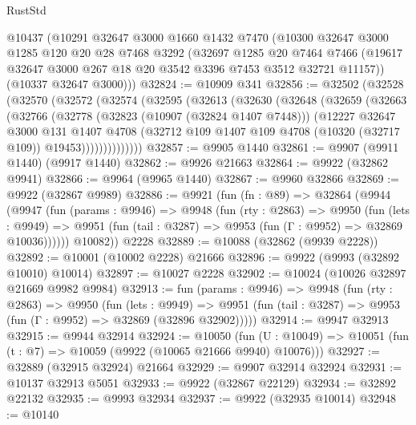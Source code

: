 \begin{lexlean}{RustStd}
\begin{coremodule}
    @10437
    (@10291
      @32647
      @3000
      @1660
      @1432
      @7470
      (@10300
        @32647
        @3000
        @1285
        @120
        @20
        @28
        @7468
        @3292
        (@32697
          @1285
          @20
          @7464
          @7466
          (@19617 @32647 @3000 @267 @18 @20 @3542 @3396 @7453 @3512 @32721 @11157))
        (@10337 @32647 @3000)))
@32824 := @10909 @341
@32856 := @32502
    (@32528
      (@32570
        (@32572
          (@32574
            (@32595
              (@32613
                (@32630
                  (@32648
                    (@32659
                      (@32663
                        (@32766
                          (@32778
                            (@32823 (@10907 (@32824 @1407 @7448)))
                            (@12227
                              @32647
                              @3000
                              @131
                              @1407
                              @4708
                              (@32712
                                @109
                                @1407
                                @109
                                @4708
                                (@10320 (@32717 @109))
                                @19453))))))))))))))
@32857 := @9905 @1440
@32861 := @9907 (@9911 @1440) (@9917 @1440)
@32862 := @9926 @21663
@32864 := @9922 (@32862 @9941)
@32866 := @9964 (@9965 @1440)
@32867 := @9960 @32866
@32869 := @9922 (@32867 @9989)
@32886 := @9921
    (fun (fn : @89) =>
    @32864
      (@9944
        (@9947
          (fun (params : @9946) =>
          @9948
            (fun (rty : @2863) =>
            @9950
              (fun (lets : @9949) =>
              @9951 (fun (tail : @3287) => @9953 (fun (Γ : @9952) => @32869 @10036))))))
        @10082))
    @2228
@32889 := @10088 (@32862 (@9939 @2228))
@32892 := @10001 (@10002 @2228) @21666
@32896 := @9922 (@9993 (@32892 @10010) @10014)
@32897 := @10027 @2228
@32902 := @10024 (@10026 @32897 @21669 @9982 @9984)
@32913 := fun (params : @9946) =>
  @9948
    (fun (rty : @2863) =>
    @9950
      (fun (lets : @9949) =>
      @9951 (fun (tail : @3287) => @9953 (fun (Γ : @9952) => @32869 (@32896 @32902)))))
@32914 := @9947 @32913
@32915 := @9944 @32914
@32924 := @10050
    (fun (U : @10049) => @10051 (fun (t : @7) => @10059 (@9922 (@10065 @21666 @9940) @10076)))
@32927 := @32889 (@32915 @32924) @21664
@32929 := @9907 @32914 @32924
@32931 := @10137 @32913 @5051
@32933 := @9922 (@32867 @22129)
@32934 := @32892 @22132
@32935 := @9993 @32934
@32937 := @9922 (@32935 @10014)
@32948 := @10140

\end{coremodule}
\end{lexlean}
